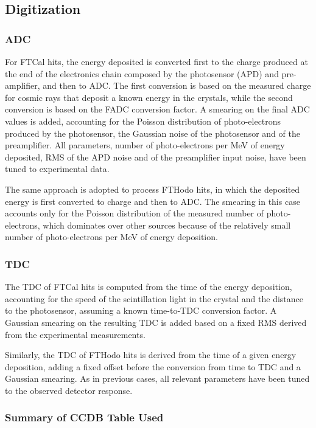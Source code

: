 \subsection{Digitization}

\subsubsection{ADC}
For FTCal hits, the energy deposited is converted first to the charge produced at the end of the electronics chain composed by the photosensor (APD) and pre-amplifier, and then to ADC. The first conversion is based on the measured charge for cosmic rays that deposit a known energy in the crystals, while the second conversion is based on the FADC conversion factor. A smearing on the final ADC values is added, accounting for the Poisson distribution of photo-electrons produced by the photosensor, the Gaussian noise of the photosensor and of the preamplifier. All parameters, number of photo-electrons per MeV of energy deposited, RMS of the APD noise and of the preamplifier input noise, have been tuned to experimental data.

The same approach is adopted to process FTHodo hits, in which the deposited energy is first converted to charge and then to ADC. The smearing in this case accounts only for the Poisson distribution of the measured number of photo-electrons, which dominates over other sources because of the relatively small number of photo-electrons per MeV of energy deposition.

\subsubsection{TDC}
The TDC of FTCal hits is computed from the time of the energy deposition, accounting for the speed of the scintillation light in the crystal and the distance to the photosensor, assuming a known time-to-TDC conversion factor. A Gaussian smearing on the resulting TDC is added based on a fixed RMS derived from the experimental measurements.

Similarly, the TDC of FTHodo hits is derived from the time of a given energy deposition, adding a fixed offset before the conversion from time to TDC and a Gaussian smearing. As in previous cases, all relevant parameters have been tuned to the observed detector response.

\subsubsection{Summary of CCDB Table Used}
